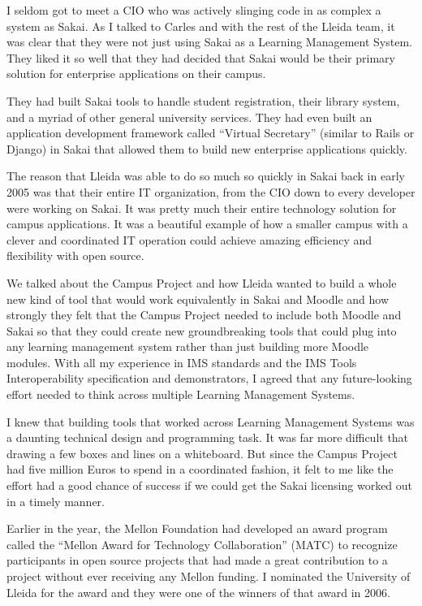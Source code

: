 \documentclass[12pt]{book}
\begin{document}
I seldom got to meet a CIO who was actively slinging
code in as complex a system as Sakai.  As I talked to Carles
and with the rest of the Lleida team, it was clear that
they were not just using Sakai as a Learning Management
System.  They liked it so well that they had decided that
Sakai would be their primary solution for enterprise applications
on their campus.

They had built Sakai tools to handle student registration, their
library system, and a myriad of other general university
services.  They had even built an application development
framework called ``Virtual Secretary''
(similar to Rails or Django) in Sakai that allowed them
to build new enterprise applications quickly.

The reason that Lleida was able to do so much so quickly
in Sakai back in early 2005 was that their entire IT organization,
from the CIO down to every developer were working on Sakai.
It was pretty much their entire technology solution for
campus applications.  It was a beautiful example of how
a smaller campus with a clever and coordinated IT operation
could achieve amazing efficiency and flexibility with open
source.

We talked about the Campus Project and how Lleida wanted to
build a whole new kind of tool that would work equivalently
in Sakai and Moodle and how strongly they felt that the Campus
Project needed to include both Moodle and Sakai so that
they could create new groundbreaking tools that could
plug into any learning management system rather than just
building more Moodle modules.   With all my experience in
IMS standards and the IMS Tools Interoperability specification
and demonstrators, I agreed that any future-looking
effort needed to think across multiple Learning Management
Systems.

I knew that building tools that worked across Learning Management
Systems was a daunting technical design and programming task.
It was far more difficult that drawing a few boxes and
lines on a whiteboard.  But since the Campus Project had five million
Euros to spend in a coordinated fashion, it felt to me like
the effort had a good chance of success if we could get the
Sakai licensing worked out in a timely manner.

Earlier in the year, the Mellon Foundation had developed an award
program called the ``Mellon Award for Technology Collaboration''
(MATC)
to recognize participants in open source projects that had
made a great contribution to a project without ever receiving any Mellon
funding.  I nominated the University of Lleida for the award
and they were one of the winners of that award in 2006.
\end{document}
